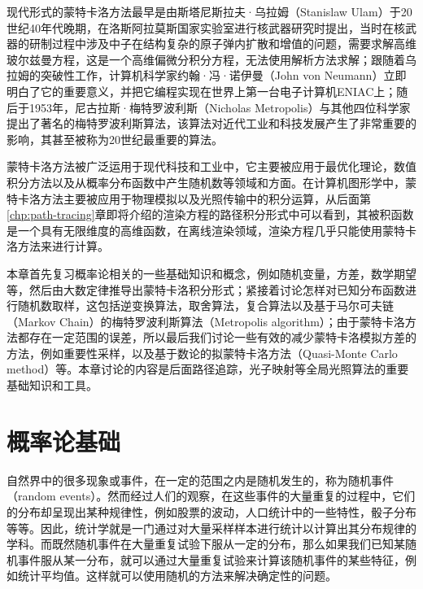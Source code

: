 现代形式的蒙特卡洛方法最早是由斯塔尼斯拉夫·乌拉姆（Stanislaw Ulam）于20世纪40年代晚期，在洛斯阿拉莫斯国家实验室进行核武器研究时提出，当时在核武器的研制过程中涉及中子在结构复杂的原子弹内扩散和增值的问题，需要求解高维玻尔兹曼方程，这是一个高维偏微分积分方程，无法使用解析方法求解；跟随着乌拉姆的突破性工作，计算机科学家约翰·冯·诺伊曼（John von Neumann）立即明白了它的重要意义，并把它编程实现在世界上第一台电子计算机ENIAC上；随后于1953年，尼古拉斯·梅特罗波利斯（Nicholas Metropolis）与其他四位科学家提出了著名的梅特罗波利斯算法\cite{a:EquationofStateCalculationsbyFastComputingMachines}，该算法对近代工业和科技发展产生了非常重要的影响，其甚至被称为20世纪最重要的算法。

蒙特卡洛方法被广泛运用于现代科技和工业中，它主要被应用于最优化理论，数值积分方法以及从概率分布函数中产生随机数等领域和方面。在计算机图形学中，蒙特卡洛方法主要被应用于物理模拟以及光照传输中的积分运算，从后面第\ref{chp:path-tracing}章即将介绍的渲染方程的路径积分形式中可以看到，其被积函数是一个具有无限维度的高维函数，在离线渲染领域，渲染方程几乎只能使用蒙特卡洛方法来进行计算。

本章首先复习概率论相关的一些基础知识和概念，例如随机变量，方差，数学期望等，然后由大数定律推导出蒙特卡洛积分形式；紧接着讨论怎样对已知分布函数进行随机数取样，这包括逆变换算法，取舍算法，复合算法以及基于马尔可夫链（Markov Chain）的梅特罗波利斯算法（Metropolis algorithm）；由于蒙特卡洛方法都存在一定范围的误差，所以最后我们讨论一些有效的减少蒙特卡洛模拟方差的方法，例如重要性采样，以及基于数论的拟蒙特卡洛方法（Quasi-Monte Carlo method）等。本章讨论的内容是后面路径追踪，光子映射等全局光照算法的重要基础知识和工具。




\section{概率论基础}\label{sec:mc-probability}
自然界中的很多现象或事件，在一定的范围之内是随机发生的，称为随机事件（random events）。然而经过人们的观察，在这些事件的大量重复的过程中，它们的分布却呈现出某种规律性，例如股票的波动，人口统计中的一些特性，骰子分布等等。因此，统计学就是一门通过对大量采样样本进行统计以计算出其分布规律的学科。而既然随机事件在大量重复试验下服从一定的分布，那么如果我们已知某随机事件服从某一分布，就可以通过大量重复试验来计算该随机事件的某些特征，例如统计平均值。这样就可以使用随机的方法来解决确定性的问题。




